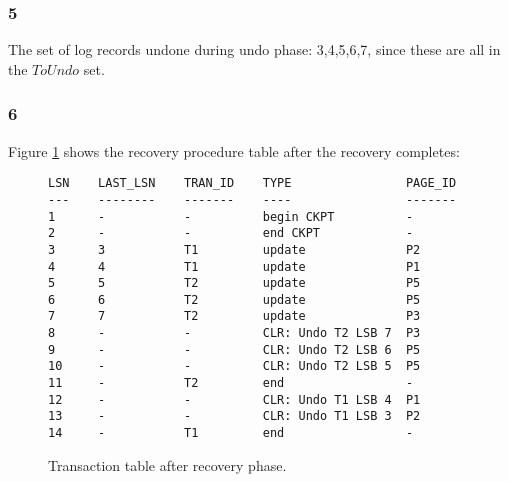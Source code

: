 \subsubsection{5}
The set of log records undone during undo phase: {3,4,5,6,7}, since these are all in the $ToUndo$ set.

\subsubsection{6}
Figure \ref{transactiontableafterrecovery} shows the recovery procedure table after the recovery completes:
\begin{figure}[h!]
\begin{verbatim}
LSN    LAST_LSN    TRAN_ID    TYPE                PAGE_ID
---    --------    -------    ----                -------
1      -           -          begin CKPT          -
2      -           -          end CKPT            -
3      3           T1         update              P2
4      4           T1         update              P1
5      5           T2         update              P5
6      6           T2         update              P5
7      7           T2         update              P3
8      -           -          CLR: Undo T2 LSB 7  P3
9      -           -          CLR: Undo T2 LSB 6  P5
10     -           -          CLR: Undo T2 LSB 5  P5
11     -           T2         end                 -
12     -           -          CLR: Undo T1 LSB 4  P1
13     -           -          CLR: Undo T1 LSB 3  P2
14     -           T1         end                 -
\end{verbatim}
\caption{Transaction table after recovery phase.\label{transactiontableafterrecovery}}
\end{figure}







